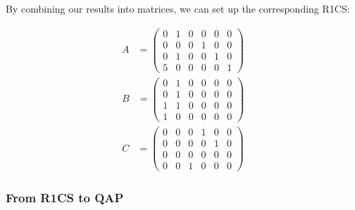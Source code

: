 By combining our results into matrices, we can set up the corresponding R1CS:

\begin{align}
A&=\begin{pmatrix}
    0 & 1 & 0 & 0 & 0 & 0 \\
    0 & 0 & 0 & 1 & 0 & 0 \\
    0 & 1 & 0 & 0 & 1 & 0 \\
    5 & 0 & 0 & 0 & 0 & 1
\end{pmatrix}
\end{align}
\begin{align*}
B&=\begin{pmatrix}
    0 & 1 & 0 & 0 & 0 & 0 \\
    0 & 1 & 0 & 0 & 0 & 0 \\
    1 & 1 & 0 & 0 & 0 & 0 \\
    1 & 0 & 0 & 0 & 0 & 0
\end{pmatrix}
\end{align*}
\begin{align*}
C&=\begin{pmatrix}
    0 & 0 & 0 & 1 & 0 & 0 \\
    0 & 0 & 0 & 0 & 1 & 0 \\
    0 & 0 & 0 & 0 & 0 & 0 \\
    0 & 0 & 1 & 0 & 0 & 0
\end{pmatrix}
\end{align*}

\subsubsection{From R1CS to QAP}

